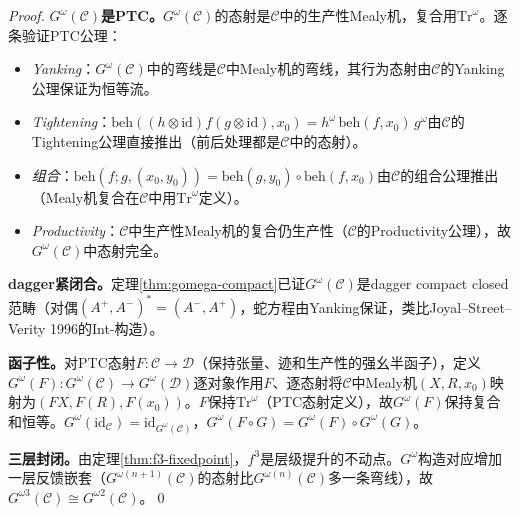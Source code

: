 \documentclass[11pt,a4paper]{article}
\begin{document}
\begin{proof}
\textbf{$G^\omega(\mathcal{C})$是PTC。}$G^\omega(\mathcal{C})$的态射是$\mathcal{C}$中的生产性Mealy机，复合用$\mathrm{Tr}^\omega$。逐条验证PTC公理：
\begin{itemize}
  \item \emph{Yanking}：$G^\omega(\mathcal{C})$中的弯线是$\mathcal{C}$中Mealy机的弯线，其行为态射由$\mathcal{C}$的Yanking公理保证为恒等流。
  \item \emph{Tightening}：$\mathrm{beh}((h\otimes\mathrm{id})f(g\otimes\mathrm{id}),x_0)=h^\omega\,\mathrm{beh}(f,x_0)\,g^\omega$由$\mathcal{C}$的Tightening公理直接推出（前后处理都是$\mathcal{C}$中的态射）。
  \item \emph{组合}：$\mathrm{beh}(f;g,(x_0,y_0))=\mathrm{beh}(g,y_0)\circ\mathrm{beh}(f,x_0)$由$\mathcal{C}$的组合公理推出（Mealy机复合在$\mathcal{C}$中用$\mathrm{Tr}^\omega$定义）。
  \item \emph{Productivity}：$\mathcal{C}$中生产性Mealy机的复合仍生产性（$\mathcal{C}$的Productivity公理），故$G^\omega(\mathcal{C})$中态射完全。
\end{itemize}

\textbf{dagger紧闭合。}定理\ref{thm:gomega-compact}已证$G^\omega(\mathcal{C})$是dagger compact closed范畴（对偶$(A^+,A^-)^*=(A^-,A^+)$，蛇方程由Yanking保证，类比Joyal--Street--Verity 1996的Int-构造）。

\textbf{函子性。}对PTC态射$F:\mathcal{C}\to\mathcal{D}$（保持张量、迹和生产性的强幺半函子），定义$G^\omega(F):G^\omega(\mathcal{C})\to G^\omega(\mathcal{D})$逐对象作用$F$、逐态射将$\mathcal{C}$中Mealy机$(X,R,x_0)$映射为$(FX,F(R),F(x_0))$。$F$保持$\mathrm{Tr}^\omega$（PTC态射定义），故$G^\omega(F)$保持复合和恒等。$G^\omega(\mathrm{id}_\mathcal{C})=\mathrm{id}_{G^\omega(\mathcal{C})}$，$G^\omega(F\circ G)=G^\omega(F)\circ G^\omega(G)$。

\textbf{三层封闭。}由定理\ref{thm:f3-fixedpoint}，$f^3$是层级提升的不动点。$G^\omega$构造对应增加一层反馈嵌套（$G^{\omega(n+1)}(\mathcal{C})$的态射比$G^{\omega(n)}(\mathcal{C})$多一条弯线），故$G^{\omega 3}(\mathcal{C})\cong G^{\omega 2}(\mathcal{C})$。\qed
\end{proof}
\end{document}
